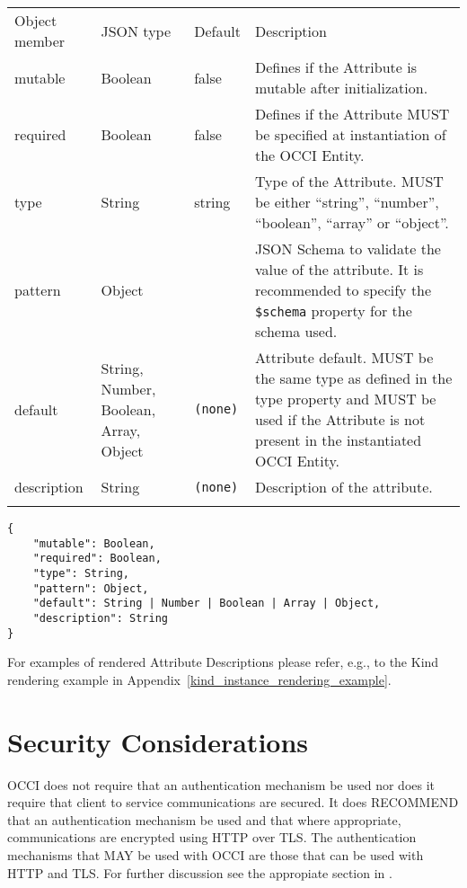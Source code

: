 \documentclass[10pt,a4paper]{article}
\begin{document}
 {
    \begin{tabularx}{\textwidth}{lllX}
    \toprule
    Object member   & JSON type                               & Default   & Description \\
    \colrule
    mutable         & Boolean                                 & false     & Defines if the Attribute is mutable after initialization. \\

    required        & Boolean                                 & false     & Defines if the Attribute MUST be specified at instantiation of the OCCI Entity. \\

    type            & String                                  & string    & Type of the Attribute. MUST be either ``string'', ``number'', ``boolean'', ``array'' or ``object''. \\

    pattern         & Object                                  & {}        & JSON Schema \cite{json-schema} to validate the value of the attribute. It is recommended to specify the \texttt{\$schema} property for the schema used. \\

    default         & String, Number, Boolean, Array, Object  & {\tt (none)} & Attribute default. MUST be the same type as defined in the type property and MUST be used if the Attribute is not present in the instantiated OCCI Entity. \\

    description     & String                                  & {\tt (none)} & Description of the attribute. \\
    \botrule
    \end{tabularx}
}
\begin{lstlisting}
{
    "mutable": Boolean,
    "required": Boolean,
    "type": String,
    "pattern": Object,
    "default": String | Number | Boolean | Array | Object,
    "description": String
}
\end{lstlisting}

For examples of rendered Attribute Descriptions please refer, e.g., to
the Kind rendering example in Appendix~\ref{kind_instance_rendering_example}.

\section{Security Considerations}
OCCI does not require that an authentication mechanism be used nor
does it require that client to service communications are secured. It
does RECOMMEND that an authentication mechanism be used and that where
appropriate, communications are encrypted using HTTP over TLS. The
authentication mechanisms that MAY be used with OCCI are those that
can be used with HTTP and TLS. For further discussion see the
appropiate section in \cite{occi:http_protocol}.
\end{document}
